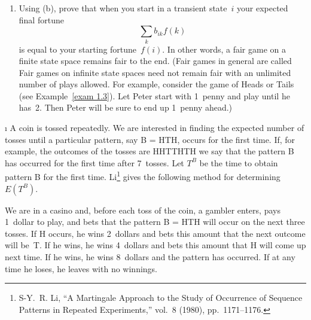 \begin{LJSItem}
\begin{enumerate}
\item Using (b), prove that when you start in a transient state~$i$ your
expected final fortune
$$
\sum_k b_{ik} f(k)
$$
is equal to your starting fortune~$f(i)$.  In other words, a fair game on a
finite state space remains fair to the end.  (Fair games in general are called
  Fair games on infinite state spaces need
not 
remain fair with an unlimited number of plays allowed.  For example, consider
the game of
Heads or Tails (see Example~\ref{exam 1.3}).  Let Peter start with 1~penny and 
play until he has~2.  Then Peter will be sure to end up 1~penny ahead.)
\end{enumerate} 

\i\label{exer 11.2.26} A coin is tossed repeatedly.  We are
interested in finding the expected number of tosses until a particular pattern,
say B = HTH, occurs for the first time.  If, for example, the outcomes of the
tosses are HHTTHTH we say that the pattern B has occurred for the first time
after 7~tosses.  Let $T^B$ be the time to obtain pattern B for the first
time.  Li\footnote{S-Y.~R. Li, ``A Martingale Approach to the Study of
Occurrence of Sequence Patterns in Repeated Experiments,''  vol.~8 (1980), pp.~1171--1176.} gives the following method for
determining $E(T^B)$. 

We are in a casino and, before
each toss of the coin, a gambler enters, pays 1~dollar to play, and bets that
the pattern B = HTH will occur on the next three tosses.  If H occurs, he wins
2~dollars and bets this amount that the next outcome will be~T.  If he wins, he
wins 4~dollars and bets this amount that H will come up next time.  If he wins,
he wins 8~dollars and the pattern has occurred.  If at any time he loses, he
leaves with no winnings.  


\end{LJSItem}

